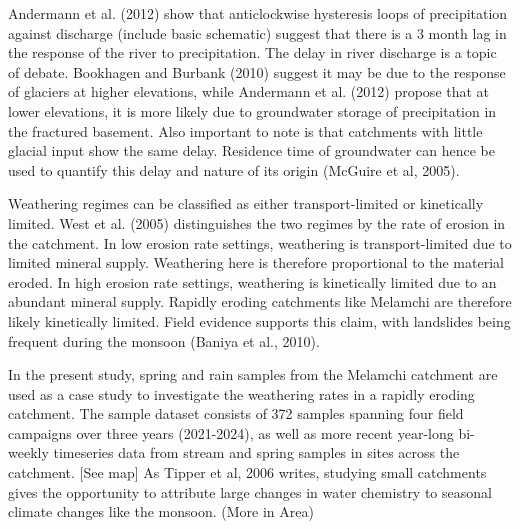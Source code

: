 \bsk

Andermann et al. (2012) show that anticlockwise hysteresis loops of precipitation against discharge (include basic schematic) suggest that there is a 3 month lag in the response of the river to precipitation.  The delay in river discharge is a topic of debate. 
Bookhagen and Burbank (2010) suggest it may be due to the response of glaciers at higher elevations,  while Andermann et al. (2012) propose that at lower elevations, it is more likely due to groundwater storage of precipitation in the fractured basement. Also important to note is that catchments with little glacial input show the same delay. Residence time of groundwater can hence be used to quantify this delay and nature of its origin (McGuire et al, 2005).

\bsk

Weathering regimes can be classified as either transport-limited or kinetically limited. West et al. (2005) distinguishes the two regimes by the rate of erosion in the catchment. In low erosion rate settings, weathering is transport-limited due to limited mineral supply. Weathering here is therefore proportional to the material eroded. In high erosion rate settings, weathering is kinetically limited due to an abundant mineral supply. Rapidly eroding catchments like Melamchi are therefore likely kinetically limited. Field evidence supports this claim, with landslides being frequent during the monsoon (Baniya et al., 2010).


\bsk



In the present study, spring and rain samples from the Melamchi catchment are used as a case 
study to investigate the weathering rates in a rapidly eroding catchment. The sample dataset consists of 372 samples spanning four field campaigns over three years (2021-2024), as well as more recent year-long bi-weekly timeseries data from stream and spring samples in sites across the catchment. [See map] 
As Tipper et al, 2006 writes, studying small catchments gives the opportunity to attribute large changes in water chemistry to seasonal climate changes like the monsoon. (More in Area)


 
\bsk

